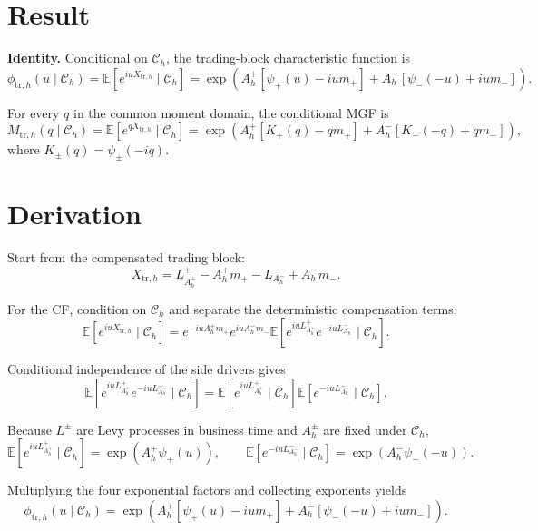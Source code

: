\documentclass[11pt]{article}
\begin{document}
\section{Result}

\noindent\textbf{Identity.} Conditional on \(\mathcal C_h\), the trading-block
characteristic function is
\[
    \phi_{\mathrm{tr},h}(u\mid\mathcal C_h)
    =
    \mathbb E\!\left[e^{iuX_{\mathrm{tr},h}}\mid\mathcal C_h\right]
    =
    \exp\!\left(
        A_h^+\left[\psi_+(u)-ium_+\right]
        +
        A_h^-\left[\psi_-(-u)+ium_-\right]
    \right).
\]

For every \(q\) in the common moment domain, the conditional MGF is
\[
    M_{\mathrm{tr},h}(q\mid\mathcal C_h)
    =
    \mathbb E\!\left[e^{qX_{\mathrm{tr},h}}\mid\mathcal C_h\right]
    =
    \exp\!\left(
        A_h^+\left[K_+(q)-qm_+\right]
        +
        A_h^-\left[K_-(-q)+qm_-\right]
    \right),
\]
where \(K_\pm(q)=\psi_\pm(-iq)\).

\section{Derivation}

Start from the compensated trading block:
\[
    X_{\mathrm{tr},h}
    =
    L_{A_h^+}^+ - A_h^+m_+
    -L_{A_h^-}^- + A_h^-m_-.
\]

For the CF, condition on \(\mathcal C_h\) and separate the deterministic
compensation terms:
\[
    \mathbb E\!\left[e^{iuX_{\mathrm{tr},h}}\mid\mathcal C_h\right]
    =
    e^{-iuA_h^+m_+}
    e^{iuA_h^-m_-}
    \mathbb E\!\left[
        e^{iuL_{A_h^+}^+}
        e^{-iuL_{A_h^-}^-}
        \mid\mathcal C_h
    \right].
\]

Conditional independence of the side drivers gives
\[
    \mathbb E\!\left[
        e^{iuL_{A_h^+}^+}
        e^{-iuL_{A_h^-}^-}
        \mid\mathcal C_h
    \right]
    =
    \mathbb E\!\left[e^{iuL_{A_h^+}^+}\mid\mathcal C_h\right]
    \mathbb E\!\left[e^{-iuL_{A_h^-}^-}\mid\mathcal C_h\right].
\]

Because \(L^\pm\) are Levy processes in business time and \(A_h^\pm\) are fixed
under \(\mathcal C_h\),
\[
    \mathbb E\!\left[e^{iuL_{A_h^+}^+}\mid\mathcal C_h\right]
    =
    \exp\!\left(A_h^+\psi_+(u)\right),
    \qquad
    \mathbb E\!\left[e^{-iuL_{A_h^-}^-}\mid\mathcal C_h\right]
    =
    \exp\!\left(A_h^-\psi_-(-u)\right).
\]

Multiplying the four exponential factors and collecting exponents yields
\[
    \phi_{\mathrm{tr},h}(u\mid\mathcal C_h)
    =
    \exp\!\left(
        A_h^+\left[\psi_+(u)-ium_+\right]
        +
        A_h^-\left[\psi_-(-u)+ium_-\right]
    \right).
\]
\end{document}
